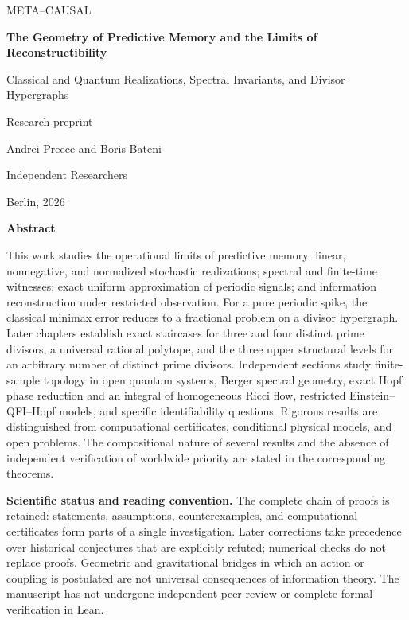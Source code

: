 \documentclass[11pt,a4paper,oneside]{book}
\begin{document}
\begin{titlepage}
\centering
{\Large\sffamily\color{ink} META--CAUSAL\par}
\vspace{14mm}
{\Huge\bfseries The Geometry of Predictive Memory and the Limits of Reconstructibility\par}
\vspace{8mm}
{\Large Classical and Quantum Realizations, Spectral Invariants, and Divisor Hypergraphs\par}
\vspace{10mm}
{\large Research preprint\par}
\vspace{4mm}
{\large Andrei Preece and Boris Bateni\par}
{Independent Researchers\par Berlin, 2026\par}
\vfill
\begin{minipage}{0.94\textwidth}
\begin{center}\textbf{Abstract}\end{center}
This work studies the operational limits of predictive memory: linear, nonnegative, and normalized stochastic realizations; spectral and finite-time witnesses; exact uniform approximation of periodic signals; and information reconstruction under restricted observation. For a pure periodic spike, the classical minimax error reduces to a fractional problem on a divisor hypergraph. Later chapters establish exact staircases for three and four distinct prime divisors, a universal rational polytope, and the three upper structural levels for an arbitrary number of distinct prime divisors. Independent sections study finite-sample topology in open quantum systems, Berger spectral geometry, exact Hopf phase reduction and an integral of homogeneous Ricci flow, restricted Einstein--QFI--Hopf models, and specific identifiability questions. Rigorous results are distinguished from computational certificates, conditional physical models, and open problems. The compositional nature of several results and the absence of independent verification of worldwide priority are stated in the corresponding theorems.

\medskip\noindent\textbf{Scientific status and reading convention.} The complete chain of proofs is retained: statements, assumptions, counterexamples, and computational certificates form parts of a single investigation. Later corrections take precedence over historical conjectures that are explicitly refuted; numerical checks do not replace proofs. Geometric and gravitational bridges in which an action or coupling is postulated are not universal consequences of information theory. The manuscript has not undergone independent peer review or complete formal verification in Lean.
\end{minipage}
\vfill
\end{titlepage}
\tableofcontents
\end{document}
